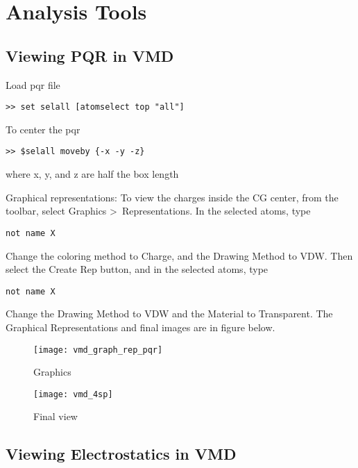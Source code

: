 
\chapter{Analysis Tools}

\section{Viewing PQR in VMD}

Load pqr file
\begin{lstlisting}[style = MyBash]
>> set selall [atomselect top "all"]
\end{lstlisting}

To center the pqr
\begin{lstlisting}[style = MyBash]
>> $selall moveby {-x -y -z}
\end{lstlisting}
where x, y, and z are half the box length

Graphical representations:
To view the charges inside the CG center, from the toolbar, select Graphics \textgreater \,
Representations. In the selected atoms, type
\begin{lstlisting}[style = MyBash]
not name X
\end{lstlisting}

Change the coloring method to Charge, and the Drawing Method to VDW. Then select the 
Create Rep button, and in the selected atoms, type 
\begin{lstlisting}[style = MyBash]
not name X
\end{lstlisting}

 Change the Drawing Method to VDW and the Material to Transparent. 
 The Graphical Representations and final images are in figure below.

\begin{figure}[!htbp]
  \centering
  \begin{minipage}[b]{0.3\textwidth}
    \texttt{[image: vmd\_graph\_rep\_pqr]}
    \caption{Graphics}
  \end{minipage}
  \hfill
  \begin{minipage}[b]{0.65\textwidth}
    \texttt{[image: vmd\_4sp]}
    \caption{Final view}
  \end{minipage}
\end{figure}

\section{Viewing Electrostatics in VMD}

